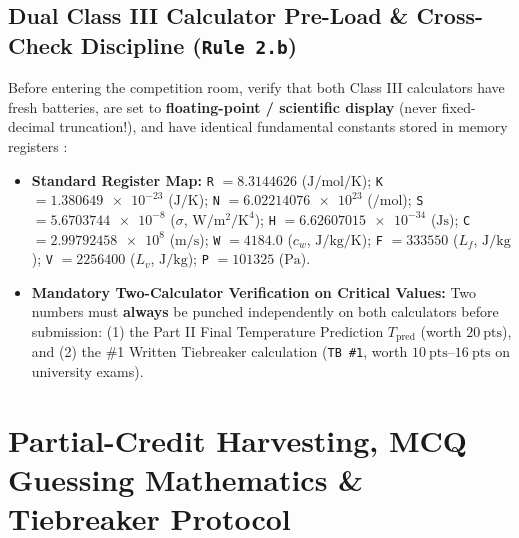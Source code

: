 \subsection{Dual Class III Calculator Pre-Load \& Cross-Check Discipline (\texttt{Rule 2.b})}
Before entering the competition room, verify that both Class III calculators have fresh batteries, are set to \textbf{floating-point / scientific display} (never fixed-decimal truncation!), and have identical fundamental constants stored in memory registers :
\begin{itemize}
  \item \textbf{Standard Register Map:} \texttt{R} $= \num{8.3144626}$ ($\si{\joule\per\mole\per\kelvin}$); \texttt{K} $= \num{1.380649e-23}$ ($\si{\joule\per\kelvin}$); \texttt{N} $= \num{6.02214076e23}$ ($\si{\per\mole}$); \texttt{S} $= \num{5.6703744e-8}$ ($\sigma$, $\si{\watt\per\square\meter\per\kelvin\tothe{4}}$); \texttt{H} $= \num{6.62607015e-34}$ ($\si{\joule\second}$); \texttt{C} $= \num{2.99792458e8}$ ($\si{\meter\per\second}$); \texttt{W} $= \num{4184.0}$ ($c_w$, $\si{\joule\per\kilogram\per\kelvin}$); \texttt{F} $= \num{333550}$ ($L_f$, $\si{\joule\per\kilogram}$); \texttt{V} $= \num{2256400}$ ($L_v$, $\si{\joule\per\kilogram}$); \texttt{P} $= \num{101325}$ ($\si{\pascal}$).
  \item \textbf{Mandatory Two-Calculator Verification on Critical Values:} Two numbers must \textbf{always} be punched independently on both calculators before submission: (1) the Part II Final Temperature Prediction $T_{\mathrm{pred}}$ (worth $\SI{20}{\text{pts}}$), and (2) the \#1 Written Tiebreaker calculation (\texttt{TB \#1}, worth $\SIrange{10}{16}{\text{pts}}$ on university exams).
\end{itemize}

\section{Partial-Credit Harvesting, MCQ Guessing Mathematics \& Tiebreaker Protocol}\label{sec:21.4}


